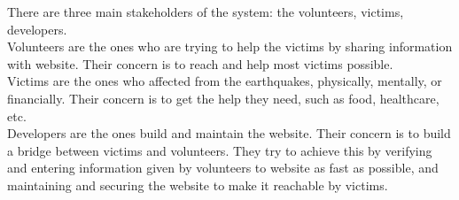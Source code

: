 There are three main stakeholders of the system: the volunteers, victims, developers. \\

Volunteers are the ones who are trying to help the victims by sharing information with website. Their concern is to reach and help most victims possible.\\

Victims are the ones who affected from the earthquakes, physically, mentally, or financially. Their concern is to get the help they need, such as food, healthcare, etc.\\

Developers are the ones build and maintain the website. Their concern is to build a bridge between victims and volunteers. They try to achieve this by verifying and entering information given by volunteers to website as fast as possible, and maintaining and securing the website to make it reachable by victims.\\


